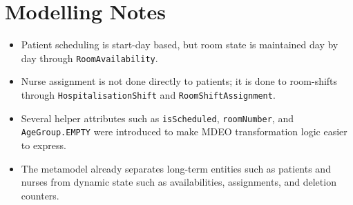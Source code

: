 \documentclass[10pt]{article}
\begin{document}
\section*{Modelling Notes}
\begin{itemize}
    \item Patient scheduling is start-day based, but room state is maintained day by day through \texttt{RoomAvailability}.
    \item Nurse assignment is not done directly to patients; it is done to room-shifts through \texttt{HospitalisationShift} and \texttt{RoomShiftAssignment}.
    \item Several helper attributes such as \texttt{isScheduled}, \texttt{roomNumber}, and \texttt{AgeGroup.EMPTY} were introduced to make MDEO transformation logic easier to express.
    \item The metamodel already separates long-term entities such as patients and nurses from dynamic state such as availabilities, assignments, and deletion counters.
\end{itemize}
\end{document}
